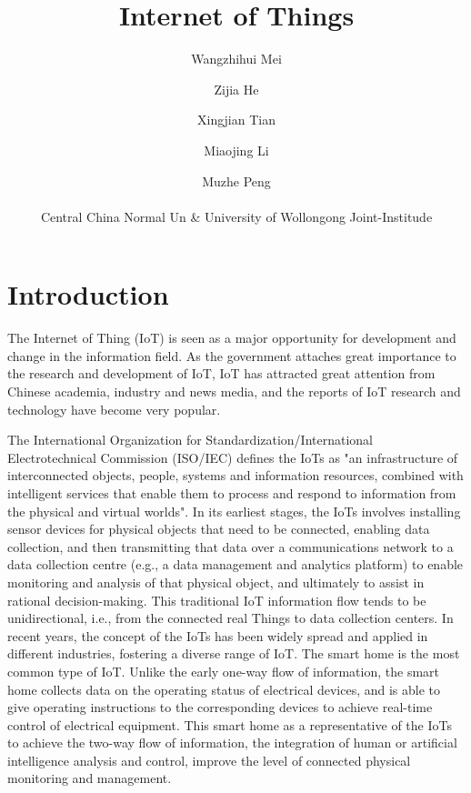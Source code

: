 \documentclass[a4paper,11pt]{article}
\begin{document}
\title{Internet of Things}
\author{Wangzhihui Mei \and Zijia He \and Xingjian Tian \and Miaojing Li \and Muzhe Peng \\ \\
Central China Normal Un \& 
University of Wollongong Joint-Institude}

\date{}
\maketitle
\thispagestyle{empty}
\clearpage


\newpage
\setcounter{page}{1} %

\section{Introduction}
The Internet of Thing (IoT) is seen as a major opportunity for development and change in the information field. As the government attaches great importance to the research and development of IoT, IoT has attracted great attention from Chinese academia, industry and news media, and the reports of IoT research and technology have become very popular\cite{dong2017understanding}.

The International Organization for Standardization/International Electrotechnical Commission (ISO/IEC) defines the IoTs as "an infrastructure of interconnected objects, people, systems and information resources, combined with intelligent services that enable them to process and respond to information from the physical and virtual worlds"\cite{iotdef}. In its earliest stages, the IoTs involves installing sensor devices for physical objects that need to be connected, enabling data collection, and then transmitting that data over a communications network to a data collection centre (e.g., a data management and analytics platform) to enable monitoring and analysis of that physical object, and ultimately to assist in rational decision-making. This traditional IoT information flow tends to be unidirectional, i.e., from the connected real Things to data collection centers. In recent years, the concept of the IoTs has been widely spread and applied in different industries, fostering a diverse range of IoT\cite{salman2018iot}. The smart home is the most common type of IoT. Unlike the early one-way flow of information, the smart home collects data on the operating status of electrical devices, and is able to give operating instructions to the corresponding devices to achieve real-time control of electrical equipment. This smart home as a representative of the IoTs to achieve the two-way flow of information, the integration of human or artificial intelligence analysis and control, improve the level of connected physical monitoring and management.
\end{document}
